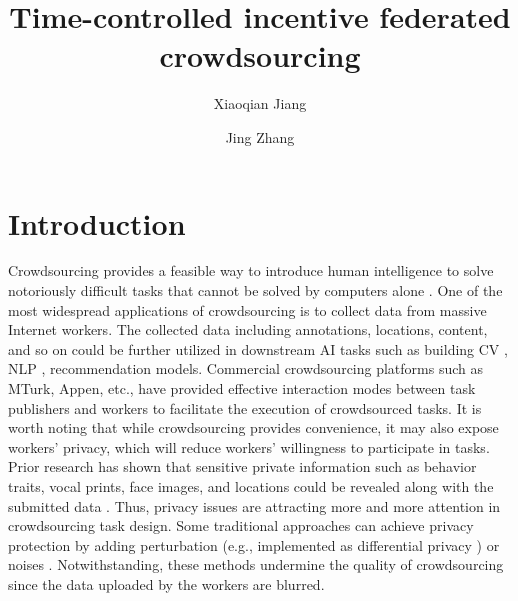 \documentclass[final,1p,times]{elsarticle}
\begin{document}
	
\begin{frontmatter}
		
\title{Time-controlled incentive federated crowdsourcing}
		

\author[mymainaddress]{Xiaoqian Jiang }
		
\author[mymainaddress]{Jing Zhang
}
		
		
\address[mymainaddress]{School of Cyber Science and Engineering, Southeast University, No. 2 SEU Road, Nanjing 211189, China}
		
\begin{abstract}
			
\end{abstract}
\begin{keyword}
	
\end{keyword}
\end{frontmatter}

\section{Introduction}
Crowdsourcing provides a feasible way to introduce human intelligence to solve notoriously difficult tasks that cannot be solved by computers alone \citep{Vaughan2017MakingBU}. One of the most widespread applications of crowdsourcing is to collect data from massive Internet workers. The collected data including annotations, locations, content, and so on could be further utilized in downstream AI tasks such as building CV \citep{Kovashka2016CrowdsourcingIC}, NLP \citep{Wang2013PerspectivesOC}, recommendation \citep{Lin2023CompetitiveGI} models. Commercial crowdsourcing platforms such as MTurk, Appen, etc., have provided effective interaction modes between task publishers and workers to facilitate the execution of crowdsourced tasks. It is worth noting that while crowdsourcing provides convenience, it may also expose workers' privacy, which will reduce workers' willingness to participate in tasks. Prior research has shown that sensitive private information such as behavior traits, vocal prints, face images, and locations could be revealed along with the submitted data \citep{xia2020privacy,Tong2020FederatedLI}. Thus, privacy issues are attracting more and more attention in crowdsourcing task design. Some traditional approaches can achieve privacy protection by adding perturbation (e.g., implemented as differential privacy \citep{luo2016incentive,wang2022pps}) or noises \citep{to2018ppo,huang2020traffic}. Notwithstanding, these methods undermine the quality of crowdsourcing since the data uploaded by the workers are blurred.
\end{document}
